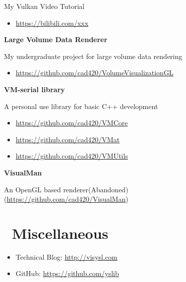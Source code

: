 \documentclass{resume}
\begin{document}
   My Vulkan Video Tutorial
\begin{itemize}
  \item \url{https://bilibili.com/xxx}
\end{itemize}

\textbf{Large Volume Data Renderer}

  My undergraduate project for large volume data rendering 

\begin{itemize}
  \item \url{https://github.com/cad420/VolumeVisualizationGL}
\end{itemize}

\textbf{VM-serial library}

 A personal use library for basic C++ development

\begin{itemize}
  \item \url{https://github.com/cad420/VMCore}
  \item \url{https://github.com/cad420/VMat}
  \item \url{https://github.com/cad420/VMUtils}
\end{itemize}

\textbf{VisualMan}

  An OpenGL based renderer(Abandoned) (\url{https://github.com/cad420/VisualMan})


\section{\faInfo\ Miscellaneous}
\begin{itemize}[parsep=0.5ex]
  \item Technical Blog: \url{http://visysl.com}
  \item GitHub: \url{https://github.com/yslib}
\end{itemize}
\end{document}
